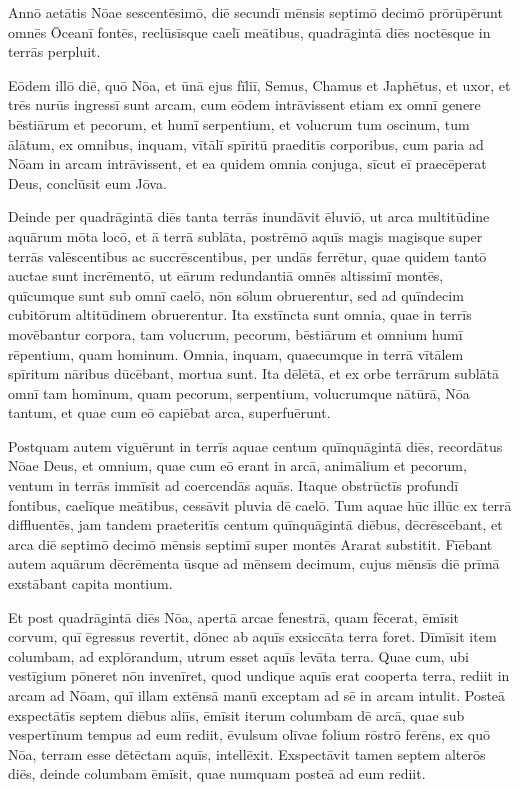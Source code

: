 \Versus Annō aetātis Nōae sescentēsimō, diē secundī mēnsis septimō decimō prōrūpērunt omnēs Ōceanī fontēs, reclūsīsque caelī meātibus,
\Versus quadrāgintā diēs noctēsque in terrās perpluit.

\Versus Eōdem illō diē, quō Nōa, et ūnā ejus fīliī, Semus, Chamus et Japhētus, et uxor, et trēs nurūs ingressī sunt arcam,
\Versus cum eōdem intrāvissent etiam ex omnī genere bēstiārum et pecorum, et humī serpentium, et volucrum tum oscinum, tum ālātum,
\Versus ex omnibus, inquam, vītālī spīritū praeditīs corporibus, cum paria ad Nōam in arcam intrāvissent,
\Versus et ea quidem omnia conjuga, sīcut eī praecēperat Deus, conclūsit eum Jōva.

\Versus Deinde per quadrāgintā diēs tanta terrās inundāvit ēluviō, ut arca multitūdine aquārum mōta locō, et ā terrā sublāta,
\Versus postrēmō aquīs magis magisque super terrās valēscentibus ac succrēscentibus, per undās ferrētur,
\Versus quae quidem tantō auctae sunt incrēmentō, ut eārum redundantiā omnēs altissimī montēs, quīcumque sunt sub omnī caelō, nōn sōlum obruerentur,
\Versus sed ad quīndecim cubitōrum altitūdinem obruerentur.
\Versus Ita exstīncta sunt omnia, quae in terrīs movēbantur corpora, tam volucrum, pecorum, bēstiārum et omnium humī rēpentium, quam hominum.
\Versus Omnia, inquam, quaecumque in terrā vītālem spīritum nāribus dūcēbant, mortua sunt.
\Versus Ita dēlētā, et ex orbe terrārum sublātā omnī tam hominum, quam pecorum, serpentium, volucrumque nātūrā, Nōa tantum, et quae cum eō capiēbat arca, superfuērunt.



\Caput
\Versus Postquam autem viguērunt in terrīs aquae centum quīnquāgintā diēs, recordātus Nōae Deus, et omnium, quae cum eō erant in arcā, animālium et pecorum, ventum in terrās immīsit ad coercendās aquās.
\Versus Itaque obstrūctīs profundī fontibus, caelīque meātibus, cessāvit pluvia dē caelō.
\Versus Tum aquae hūc illūc ex terrā diffluentēs, jam tandem praeteritīs centum quīnquāgintā diēbus, dēcrēscēbant,
\Versus et arca diē septimō decimō mēnsis septimī super montēs Ararat substitit.
\Versus Fīēbant autem aquārum dēcrēmenta ūsque ad mēnsem decimum, cujus mēnsīs diē prīmā exstābant capita montium.

\Versus Et post quadrāgintā diēs Nōa, apertā arcae fenestrā, quam fēcerat,
\Versus ēmīsit corvum, quī ēgressus revertit, dōnec ab aquīs exsiccāta terra foret.
\Versus Dīmīsit item columbam, ad explōrandum, utrum esset aquīs levāta terra.
\Versus Quae cum, ubi vestīgium pōneret nōn invenīret, quod undique aquīs erat cooperta terra, rediit in arcam ad Nōam, quī illam extēnsā manū exceptam ad sē in arcam intulit.
\Versus Posteā exspectātīs septem diēbus aliīs, ēmīsit iterum columbam dē arcā,
\Versus quae sub vespertīnum tempus ad eum rediit, ēvulsum olīvae folium rōstrō ferēns, ex quō Nōa, terram esse dētēctam aquīs, intellēxit.
\Versus Exspectāvit tamen septem alterōs diēs, deinde columbam ēmīsit, quae numquam posteā ad eum rediit.

